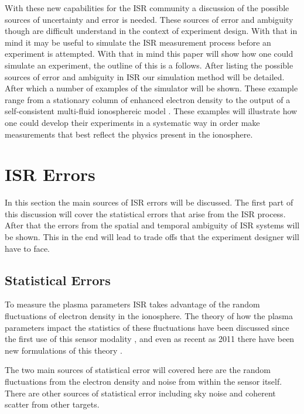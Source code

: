 \documentclass[draft,ras]{agutex}
\begin{document}
\begin{article}
With these new capabilities for the ISR community a discussion of the possible sources of uncertainty and error is needed. These sources of error and ambiguity though are difficult understand in the context of experiment design. With that in mind it may be useful to simulate the ISR measurement process before an experiment is attempted. With that in mind this paper will show how one could simulate an experiment, the outline of this is a follows. After listing the possible sources of error and ambiguity in ISR our simulation method will be detailed. After which  a number of examples of the simulator will be shown. These example range from a stationary column of enhanced electron density to the output of a self-consistent multi-fluid ionosphereic model \citep{semeter:plasmatransport2012}. These examples will illustrate how one could develop their experiments in a systematic way in order make measurements that best reflect the physics present in the ionosphere.
\section{ISR Errors}

In this section the main sources of ISR errors will be discussed. The first part of this discussion will cover the statistical errors that arise from the ISR process. After that the errors from the spatial and temporal ambiguity of ISR systems will be shown. This in the end will lead to trade offs that the experiment designer will have to face.

\subsection{Statistical Errors}

To measure the plasma parameters ISR takes advantage of the random fluctuations of electron density in the ionosphere. The theory of how the plasma parameters impact the statistics of these fluctuations have been discussed since the first use of this sensor modality \citep{gordon58,dougherty:farley1960, farleydougherty:ISR2, doughteryfarley:ISR3, hagfors1961}, and even as recent as 2011 there have been new formulations of this theory \citep{kudeki:milla:1,kudeki:milla:2}. 

The two main sources of statistical error will covered here are the random fluctuations from the electron density and noise from within the sensor itself. There are other sources of statistical error including sky noise and coherent scatter from other targets. 


\end{article}
\end{document}
